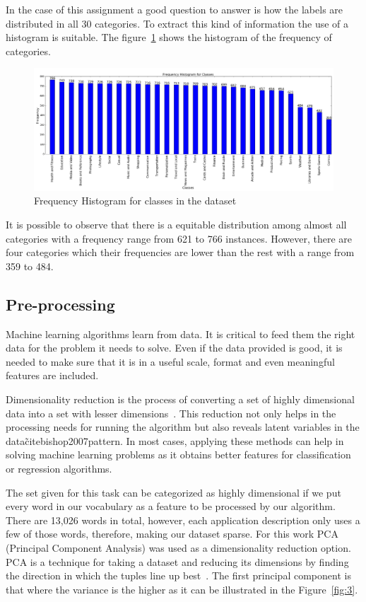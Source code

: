 \documentclass[letterpaper,10pt]{article}
\theoremstyle{mytheor}
\begin{document}
In the case of this assignment a good question to answer is how the labels are distributed in all 30 categories. To extract this kind of information the use of a histogram is suitable. The figure~\ref{fig:2} shows the histogram of the frequency of categories.

\begin{figure}[H]
\includegraphics[width=\textwidth]{histo}
\centering
\caption{Frequency Histogram for classes in the dataset}
\label{fig:2}
\end{figure}

It is possible to observe that there is a equitable distribution among almost all categories with a frequency range from 621 to 766 instances. However, there are four categories which their frequencies are lower than the rest with a range from 359 to 484.

\subsection{Pre-processing}

Machine learning algorithms learn from data. It is critical to feed them the right data for the problem it needs to solve. Even if the data provided is good, it is needed to make sure that it is in a useful scale, format and even meaningful features are included.

Dimensionality reduction is the process of converting a set of highly dimensional data into a set with lesser dimensions~\cite{russell1995modern}. This reduction not only helps in the processing needs for running the algorithm but also reveals latent variables in the data\~cite{bishop2007pattern}. In most cases, applying these methods can help in solving machine learning problems as it obtains better features for classification or regression algorithms.

The set given for this task can be categorized as highly dimensional if we put every word in our vocabulary as a feature to be processed by our algorithm. There are 13,026 words in total, however, each application description only uses a few of those words, therefore, making our dataset sparse. For this work PCA (Principal Component Analysis) was used as a dimensionality reduction option. PCA is a technique for taking a dataset and reducing its dimensions by finding the direction in which the tuples line up best~\cite{rajaraman2012mining}. The first principal component is that where the variance is the higher as it can be illustrated in the Figure~\ref{fig:3}.
\end{document}
